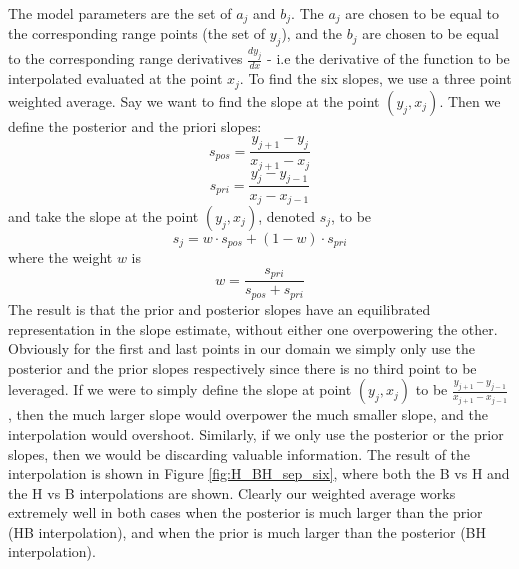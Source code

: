 \documentclass[11pt]{article}
\begin{document}
The model parameters are the set of $a_j$ and $b_j$. The $a_j$ are chosen to be equal to the corresponding range points (the set of $y_j$), and the $b_j$ are chosen to be equal to the corresponding range derivatives $\frac{d y_j}{d x}$ - i.e the derivative of the function to be interpolated evaluated at the point $x_j$. To find the six slopes, we use a three point weighted average. Say we want to find the slope at the point $(y_j, x_j)$. Then we define the posterior and the priori slopes:
$$s_{pos} = \frac{y_{j+1} - y_j}{x_{j+1} - x_j}$$
$$s_{pri} = \frac{y_{j} - y_{j-1}}{x_{j} - x_{j-1}}$$
and take the slope at the point $(y_j, x_j)$, denoted $s_j$, to be
$$\boxed{s_j = w \cdot s_{pos} + (1 - w) \cdot s_{pri}}$$
where the weight $w$ is
$$w = \frac{s_{pri}}{s_{pos} + s_{pri}}$$
The result is that the prior and posterior slopes have an equilibrated representation in the slope estimate, without either one overpowering the other. Obviously for the first and last points in our domain we simply only use the posterior and the prior slopes respectively since there is no third point to be leveraged. If we were to simply define the slope at point $(y_j, x_j)$ to be $\frac{y_{j+1} - y_{j-1}}{x_{j+1} - x_{j-1}}$, then the much larger slope would overpower the much smaller slope, and the interpolation would overshoot. Similarly, if we only use the posterior or the prior slopes, then we would be discarding valuable information. The result of the interpolation is shown in Figure \ref{fig:H_BH_sep_six}, where both the B vs H and the H vs B interpolations are shown. Clearly our weighted average works extremely well in both cases when the posterior is much larger than the prior (HB interpolation), and when the prior is much larger than the posterior (BH interpolation).
\end{document}
